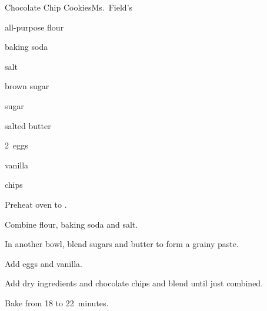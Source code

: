 \begin{recipe}{Chocolate Chip Cookies}{Ms.~Field's}{}

\begin{ingredients}
\item \C{2 \half} all-purpose flour
\item \tp{\half} baking soda
\item \tp{\quarter} salt
\item {} brown sugar
\item \C{\half} sugar
\item {} salted butter
\item 2~eggs
\item {} vanilla
\item {}  chips
\end{ingredients}

\begin{directions}
\item Preheat oven to .
\item Combine flour, baking soda and salt.
\item In another bowl, blend sugars and butter to form a grainy paste.
\item Add eggs and vanilla.
\item Add dry ingredients and chocolate chips and blend until just combined.
\item Bake from 18 to 22~minutes.
\end{directions}
\end{recipe}
